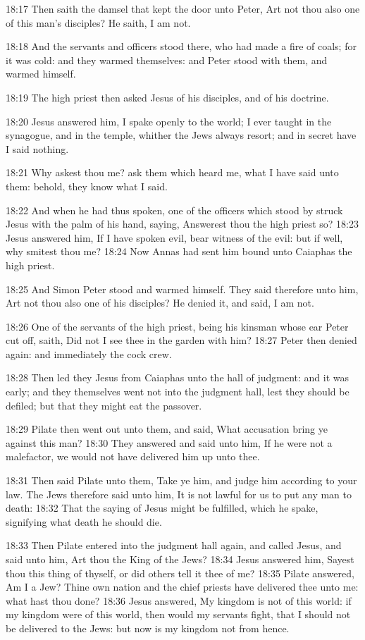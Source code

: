 18:17 Then saith the damsel that kept the door unto Peter, Art not thou also one of this man's disciples? He saith, I am not.

18:18 And the servants and officers stood there, who had made a fire of coals; for it was cold: and they warmed themselves: and Peter stood with them, and warmed himself.

18:19 The high priest then asked Jesus of his disciples, and of his doctrine.

18:20 Jesus answered him, I spake openly to the world; I ever taught in the synagogue, and in the temple, whither the Jews always resort; and in secret have I said nothing.

18:21 Why askest thou me? ask them which heard me, what I have said unto them: behold, they know what I said.

18:22 And when he had thus spoken, one of the officers which stood by struck Jesus with the palm of his hand, saying, Answerest thou the high priest so?  18:23 Jesus answered him, If I have spoken evil, bear witness of the evil: but if well, why smitest thou me?  18:24 Now Annas had sent him bound unto Caiaphas the high priest.

18:25 And Simon Peter stood and warmed himself. They said therefore unto him, Art not thou also one of his disciples? He denied it, and said, I am not.

18:26 One of the servants of the high priest, being his kinsman whose ear Peter cut off, saith, Did not I see thee in the garden with him?  18:27 Peter then denied again: and immediately the cock crew.

18:28 Then led they Jesus from Caiaphas unto the hall of judgment: and it was early; and they themselves went not into the judgment hall, lest they should be defiled; but that they might eat the passover.

18:29 Pilate then went out unto them, and said, What accusation bring ye against this man?  18:30 They answered and said unto him, If he were not a malefactor, we would not have delivered him up unto thee.

18:31 Then said Pilate unto them, Take ye him, and judge him according to your law. The Jews therefore said unto him, It is not lawful for us to put any man to death: 18:32 That the saying of Jesus might be fulfilled, which he spake, signifying what death he should die.

18:33 Then Pilate entered into the judgment hall again, and called Jesus, and said unto him, Art thou the King of the Jews?  18:34 Jesus answered him, Sayest thou this thing of thyself, or did others tell it thee of me?  18:35 Pilate answered, Am I a Jew? Thine own nation and the chief priests have delivered thee unto me: what hast thou done?  18:36 Jesus answered, My kingdom is not of this world: if my kingdom were of this world, then would my servants fight, that I should not be delivered to the Jews: but now is my kingdom not from hence.

